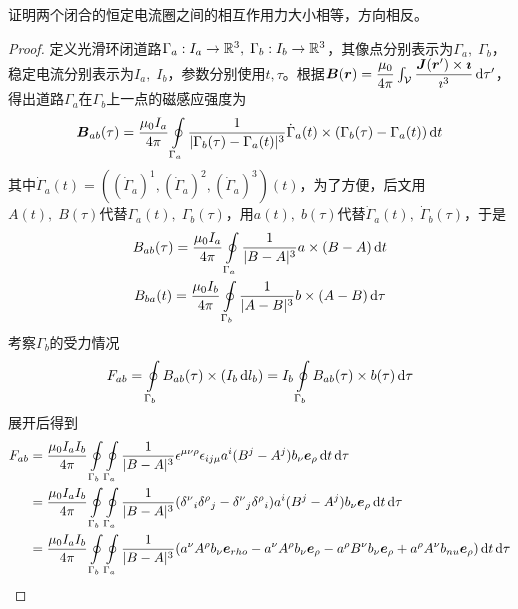 \documentclass{mynote}
\begin{document}
\begin{exercise}{1.10}
    证明两个闭合的恒定电流圈之间的相互作用力大小相等，方向相反。
\end{exercise}
\begin{proof}
    定义光滑环闭道路$\Gamma_a :I_a \to \mathbb{R}^3,\; \Gamma_b : I_b \to \mathbb{R}^3$，其像点分别表示为$\Gamma_a,\; \Gamma_b$，稳定电流分别表示为$I_a,\; I_b$，参数分别使用$t, \tau$。根据$\boldsymbol{B}(\boldsymbol{r}) = \dfrac{\mu_0}{4 \pi} \int_{\mathcal{V}} \dfrac{\boldsymbol{J}(\boldsymbol{r}') \times \boldsymbol{\imath}}{\imath^3} \mathop{}\!\mathrm{d} \tau'$，得出道路$\Gamma_a$在$\Gamma_b$上一点的磁感应强度为
    \[
    \boldsymbol{B}_{ab}(\tau) = \frac{\mu_0I_a}{4\pi} \oint\limits_{\Gamma_a} \frac{1}{\vert \Gamma_b(\tau) - \Gamma_a(t)\vert ^3} \dot{\Gamma}_a(t) \times (\Gamma_b(\tau) - \Gamma_a(t)) \mathop{}\!\mathrm{d} t 
    \]
    其中$\dot{\Gamma}_a(t) = ((\dot{\Gamma}_a)^1, (\dot{\Gamma}_a)^2, (\dot{\Gamma}_a)^3) (t)$，为了方便，后文用$A(t),\; B(\tau)$代替$\Gamma_a(t),\; \Gamma_b(\tau)$，用$a(t),\; b(\tau)$代替$\dot{\Gamma}_a(t),\; \dot{\Gamma}_b(\tau)$，于是
    \begin{gather*}
        B_{ab}(\tau) = \frac{\mu_0I_a}{4\pi} \oint\limits_{\Gamma_a} \frac{1}{\vert B - A \vert ^3} a \times (B - A) \mathop{}\!\mathrm{d} t  \\
        B_{ba}(t) =\frac{\mu_0I_b}{4\pi}  \oint\limits_{\Gamma_b} \frac{1}{\vert A - B \vert ^3} b \times (A - B) \mathop{}\!\mathrm{d} \tau
    \end{gather*} 
    考察$\Gamma_b$的受力情况
    \[
    F_{ab} = \oint\limits_{\Gamma _b} B_{ab}(\tau) \times (I_b \mathop{}\!\mathrm{d} l_b) =  I_b \oint\limits_{\Gamma _b}  B_{ab}(\tau) \times b(\tau) \mathop{}\!\mathrm{d} \tau
    \]
    展开后得到
    \begin{align*}
    F_{ab} &= \frac{\mu_0 I_a I_b}{4\pi} \oint\limits_{\Gamma _b} \oint\limits_{\Gamma_a} \frac{1}{\vert B - A \vert ^3} \epsilon^{\mu \nu \rho} \epsilon_{ij\mu} a^i (B^j - A^j)b_{\nu} \e_{\rho} \dl t \dl \tau \\
    &= \frac{\mu_0 I_a I_b}{4\pi} \oint\limits_{\Gamma _b} \oint\limits_{\Gamma_a} \frac{1}{\vert B - A \vert ^3} ({\delta^{\nu}}_i{\delta^{\rho}}_j - {\delta^{\nu}}_j{\delta^{\rho}}_i) a^i (B^j - A^j)b_{\nu} \e_{\rho} \dl t\dl \tau \\
    &= \frac{\mu_0 I_a I_b}{4\pi} \oint\limits_{\Gamma _b} \oint\limits_{\Gamma_a} \frac{1}{\vert B - A \vert ^3} (a^{\nu}A^{\rho}b_{\nu}\e_{rho} - a^{\nu} A^{\rho} b_{\nu} \e_{\rho} - a^{\rho}B^{\nu}b_{\nu}\e_{\rho} + a^{\rho} A^{\nu} b_{nu} \e_{\rho}) \dl t \dl \tau \\

\end{align*}
\end{proof}
\end{document}
